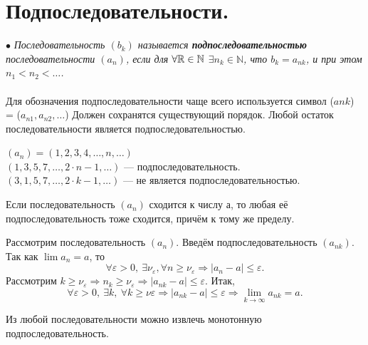 \section{Подпоследовательности.}
$\bullet$ \textit{Последовательность $(b_k)$ называется \textbf{подпоследовательностью} последовательности $(a_n)$, если для $\forall \mathbb{R} \in\mathbb{N}$ $\exists n_k  
	\in\mathbb{N}$, что $b_k = a_{nk}$, и при этом $n_1 < n_2 <\dots$.}\\\\
Для обозначения подпоследовательности чаще всего используется символ ($a{nk}$) = ($a_{n1}, a_{n2}, \dots$)
Должен сохранятся существующий порядок. Любой остаток последовательности является подпоследовательностью.\\
\begin{example}
	$(a_n) = (1, 2, 3, 4, \dots , n , \dots) $\\
	$(1, 3 ,5 ,7, \dots , 2\cdot n - 1, \dots )$ --- подпоследовательность.\\
	$(3, 1 , 5 , 7 , \dots, 2\cdot k - 1, \dots )$ --- не является подпоследовательностью.
\end{example}
\begin{theorem}
	Если последовательность $(a_n)$ сходится к числу а, то любая её подпоследовательность тоже сходится, причём к тому же пределу.
\end{theorem}
\begin{Proof}
	Рассмотрим последовательность $(a_n)$. Введём подпоследовательность $(a_{nk})$. Так как  $\lim a_n = a$, то $$\forall\varepsilon > 0,\ \exists \nu_\varepsilon, \forall n \geqslant \nu_\varepsilon \Rightarrow | a_n - a| \leqslant \varepsilon.$$
	Рассмотрим $k\geqslant \nu_\varepsilon \Rightarrow n_k \geqslant \nu_\varepsilon \Rightarrow |a_{nk} - a| \leqslant\varepsilon.$
	Итак, $$\forall \varepsilon > 0,\ \exists k,\ \forall k \geqslant \nu \varepsilon \Rightarrow |a_{nk} - a| \leqslant \varepsilon \Rightarrow \lim\limits_{k\to\infty} a_{nk} = a.$$
\end{Proof}
\begin{theorem}
	Из любой последовательности можно извлечь монотонную подпоследовательность.
\end{theorem}
